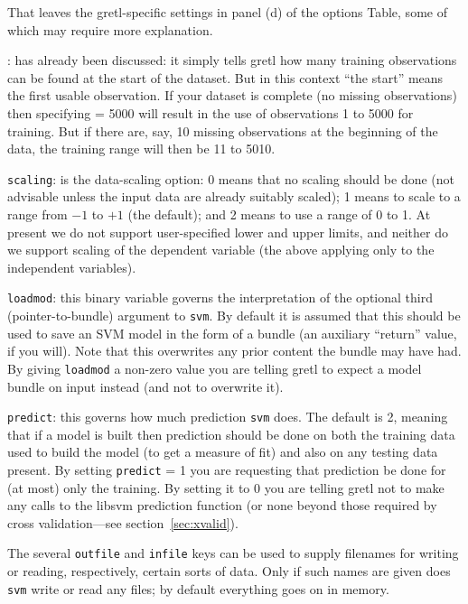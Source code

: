 \documentclass{article}
\begin{document}
That leaves the gretl-specific settings in panel (d) of the options
Table, some of which may require more explanation.

: has already been discussed: it simply tells gretl
how many training observations can be found at the start of the
dataset. But in this context ``the start'' means the first usable
observation. If your dataset is complete (no missing observations)
then specifying  = 5000 will result in the use of
observations 1 to 5000 for training. But if there are, say, 10 missing
observations at the beginning of the data, the training range will
then be 11 to 5010.

\texttt{scaling}: is the data-scaling option: 0 means that no scaling
should be done (not advisable unless the input data are already
suitably scaled); 1 means to scale to a range from $-1$ to $+1$ (the
default); and 2 means to use a range of 0 to 1. At present we do not
support user-specified lower and upper limits, and neither do we
support scaling of the dependent variable (the above applying only to
the independent variables).

\texttt{loadmod}: this binary variable governs the interpretation of
the optional third (pointer-to-bundle) argument to \texttt{svm}. By
default it is assumed that this should be used to save an SVM model in
the form of a bundle (an auxiliary ``return'' value, if you
will). Note that this overwrites any prior content the bundle may have
had. By giving \texttt{loadmod} a non-zero value you are telling gretl
to expect a model bundle on input instead (and not to overwrite it).

\texttt{predict}: this governs how much prediction \texttt{svm} does.
The default is 2, meaning that if a model is built then prediction
should be done on both the training data used to build the model (to
get a measure of fit) and also on any testing data present. By setting
\texttt{predict} = 1 you are requesting that prediction be done for
(at most) only the training. By setting it to 0 you are telling gretl
not to make any calls to the \textsf{libsvm} prediction function (or
none beyond those required by cross validation---see
section~\ref{sec:xvalid}).

The several \texttt{outfile} and \texttt{infile} keys can be used to
supply filenames for writing or reading, respectively, certain sorts
of data. Only if such names are given does \texttt{svm} write or read
any files; by default everything goes on in memory.
\end{document}
